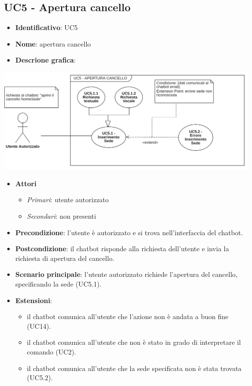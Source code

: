 \subsection{UC5 - Apertura cancello}
\begin{itemize}
    \item \textbf{Identificativo}: UC5
    \item \textbf{Nome}: apertura cancello
    \item \textbf{Descrione grafica}:
\end{itemize}

\begin{center}
    \includegraphics{images/UC5.png} 
\end{center} 

 \begin{itemize}
    \item \textbf{Attori}
 \begin{itemize} 
    \item \textit{Primari}: utente autorizzato
    \item \textit{Secondari}: non presenti
 \end{itemize}
 \item \textbf{Precondizione}: l'utente è autorizzato e si trova nell'interfaccia del chatbot.
 \item \textbf{Postcondizione}: il chatbot risponde alla richiesta dell'utente e invia la richiesta di apertura del cancello.
 \item \textbf{Scenario principale}: l'utente autorizzato richiede l'apertura del cancello, specificando la sede (UC5.1).
 \item \textbf{Estensioni}: 
 \begin{itemize} 
    \item il chatbot comunica all'utente che l'azione non è andata a buon fine (UC14).
    \item il chatbot comunica all'utente che non è stato in grado di interpretare il comando (UC2).
    \item il chatbot comunica all'utente che la sede specificata non è stata trovata (UC5.2).
 \end{itemize}
\end{itemize}
\newpage
